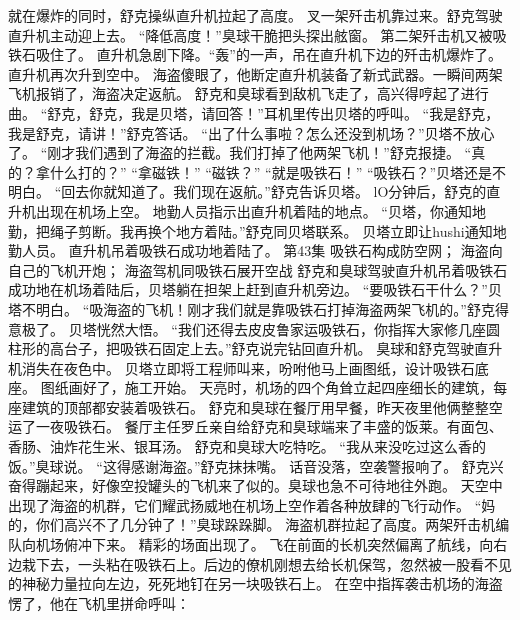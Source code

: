 \documentclass[a4paper,12pt,UTF8,twoside]{ctexbook}
\begin{document}
        就在爆炸的同时，舒克操纵直升机拉起了高度。 
        叉一架歼击机靠过来。舒克驾驶直升机主动迎上去。 
        “降低高度！”臭球干脆把头探出舷窗。 
        第二架歼击机又被吸铁石吸住了。 
        直升机急剧下降。“轰”的一声，吊在直升机下边的歼击机爆炸了。 
        直升机再次升到空中。 
        海盗傻眼了，他断定直升机装备了新式武器。一瞬间两架飞机报销了，海盗决定返航。 
        舒克和臭球看到敌机飞走了，高兴得哼起了进行曲。 
        “舒克，舒克，我是贝塔，请回答！”耳机里传出贝塔的呼叫。 
        “我是舒克，我是舒克，请讲！”舒克答话。 
        “出了什么事啦？怎么还没到机场？”贝塔不放心了。 
        “刚才我们遇到了海盗的拦截。我们打掉了他两架飞机！”舒克报捷。 
        “真的？拿什么打的？” 
        “拿磁铁！” 
        “磁铁？” 
        “就是吸铁石！” 
        “吸铁石？”贝塔还是不明白。 
        “回去你就知道了。我们现在返航。”舒克告诉贝塔。 
        lO分钟后，舒克的直升机出现在机场上空。 
        地勤人员指示出直升机着陆的地点。 
        “贝塔，你通知地勤，把绳子剪断。我再换个地方着陆。”舒克同贝塔联系。 
        贝塔立即让hushi通知地勤人员。 
        直升机吊着吸铁石成功地着陆了。   第43集 
        吸铁石构成防空网； 
        海盗向自己的飞机开炮； 
        海盗驾机同吸铁石展开空战   
        舒克和臭球驾驶直升机吊着吸铁石成功地在机场着陆后，贝塔躺在担架上赶到直升机旁边。 
        “要吸铁石干什么？”贝塔不明白。 
        “吸海盗的飞机！刚才我们就是靠吸铁石打掉海盗两架飞机的。”舒克得意极了。 
        贝塔恍然大悟。 
        “我们还得去皮皮鲁家运吸铁石，你指挥大家修几座圆柱形的高台子，把吸铁石固定上去。”舒克说完钻回直升机。 
        臭球和舒克驾驶直升机消失在夜色中。 
        贝塔立即将工程师叫来，吩咐他马上画图纸，设计吸铁石底座。 
        图纸画好了，施工开始。 
        天亮时，机场的四个角耸立起四座细长的建筑，每座建筑的顶部都安装着吸铁石。 
        舒克和臭球在餐厅用早餐，昨天夜里他俩整整空运了一夜吸铁石。 
        餐厅主任罗丘亲自给舒克和臭球端来了丰盛的饭莱。有面包、香肠、油炸花生米、银耳汤。 
        舒克和臭球大吃特吃。 
        “我从来没吃过这么香的饭。”臭球说。 
        “这得感谢海盗。”舒克抹抹嘴。 
        话音没落，空袭警报响了。 
        舒克兴奋得蹦起来，好像空投罐头的飞机来了似的。臭球也急不可待地往外跑。 
        天空中出现了海盗的机群，它们耀武扬威地在机场上空作着各种放肆的飞行动作。 
        “妈的，你们高兴不了几分钟了！”臭球跺跺脚。 
        海盗机群拉起了高度。两架歼击机编队向机场俯冲下来。 
        精彩的场面出现了。 
        飞在前面的长机突然偏离了航线，向右边栽下去，一头粘在吸铁石上。后边的僚机刚想去给长机保驾，忽然被一股看不见的神秘力量拉向左边，死死地钉在另一块吸铁石上。 
        在空中指挥袭击机场的海盗愣了，他在飞机里拼命呼叫： 
\end{document}
